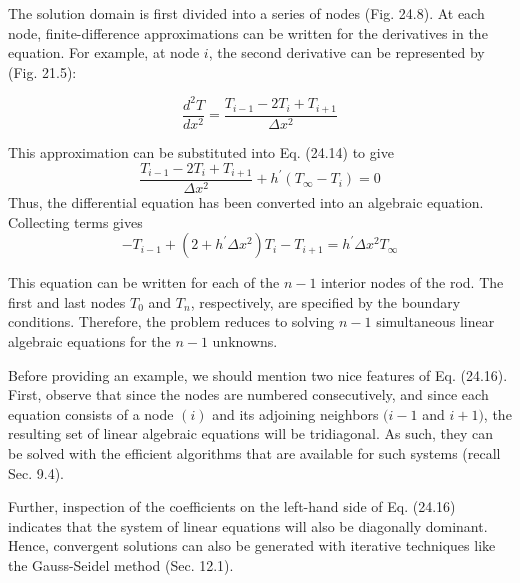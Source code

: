 \documentclass[../main.tex]{subfiles}
\begin{document}
\noindent The solution domain is first divided into a series of nodes (Fig. 24.8). At each node, finite-difference approximations can be written for the derivatives in the equation. For example, at node $i$, the second derivative can be represented by (Fig. 21.5):

\begin{equation}
    \tag{24.15}
    \frac{d^{2} T}{d x^{2}}=\frac{T_{i-1}-2 T_{i}+T_{i+1}}{\Delta x^{2}}
\end{equation}

\noindent This approximation can be substituted into Eq. (24.14) to give
$$
\frac{T_{i-1}-2 T_{i}+T_{i+1}}{\Delta x^{2}}+h^{\prime}\left(T_{\infty}-T_{i}\right)=0
$$
Thus, the differential equation has been converted into an algebraic equation. Collecting terms gives
\begin{equation}
    \tag{24.16}
    -T_{i-1}+\left(2+h^{\prime} \Delta x^{2}\right) T_{i}-T_{i+1}=h^{\prime} \Delta x^{2} T_{\infty}
\end{equation}

\noindent This equation can be written for each of the $n-1$ interior nodes of the rod. The first and last nodes $T_{0}$ and $T_{n}$, respectively, are specified by the boundary conditions. Therefore, the problem reduces to solving $n-1$ simultaneous linear algebraic equations for the $n-1$ unknowns.

Before providing an example, we should mention two nice features of Eq. (24.16). First, observe that since the nodes are numbered consecutively, and since each equation consists of a node $(i)$ and its adjoining neighbors $(i-1$ and $i+1)$, the resulting set of linear algebraic equations will be tridiagonal. As such, they can be solved with the efficient algorithms that are available for such systems (recall Sec. 9.4).

Further, inspection of the coefficients on the left-hand side of Eq. (24.16) indicates that the system of linear equations will also be diagonally dominant. Hence, convergent solutions can also be generated with iterative techniques like the Gauss-Seidel method (Sec. 12.1).
\end{document}
